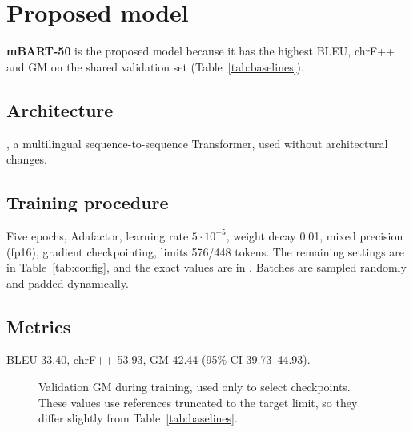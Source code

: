 \documentclass[a4paper,12pt]{article}
\begin{document}
\section{Proposed model}
\label{sec:proposed}
\textbf{mBART-50} is the proposed model because it has the highest BLEU, chrF++ and GM on the shared validation set (Table~\ref{tab:baselines}).

\subsection{Architecture}
, a multilingual sequence-to-sequence Transformer, used without architectural changes.

\subsection{Training procedure}
Five epochs, Adafactor, learning rate $5\cdot10^{-5}$, weight decay 0.01, mixed precision (fp16), gradient checkpointing, limits 576/448 tokens. The remaining settings are in Table~\ref{tab:config}, and the exact values are in . Batches are sampled randomly and padded dynamically.

\subsection{Metrics}
BLEU 33.40, chrF++ 53.93, GM 42.44 (95\% CI 39.73--44.93).

\begin{figure}[H]
    \centering
    \caption{Validation GM during training, used only to select checkpoints. These values use references truncated to the target limit, so they differ slightly from Table~\ref{tab:baselines}.}
    \label{fig:curves}
\end{figure}
\end{document}
